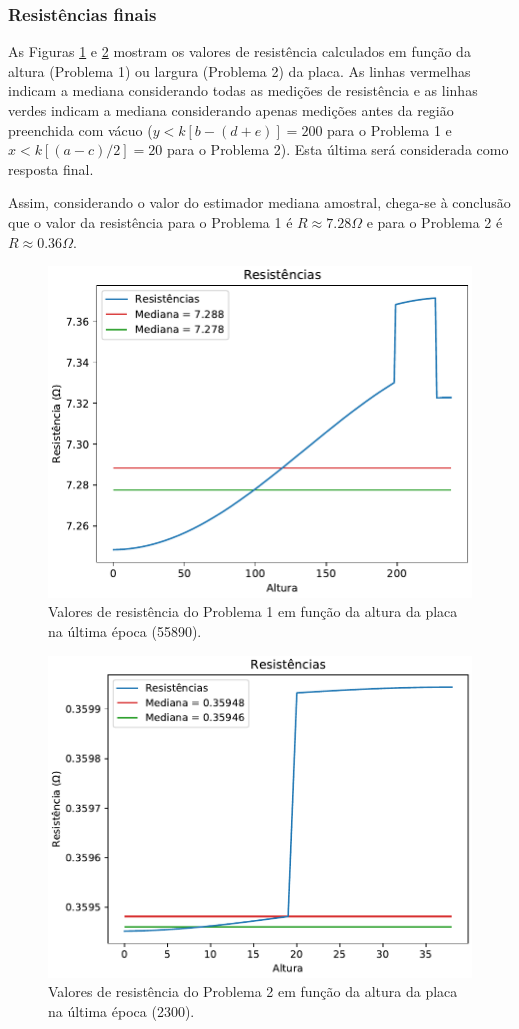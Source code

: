 \documentclass{aleph-revista}
\begin{document}
\newpage
\subsubsection{Resistências finais}

As Figuras \ref{fig:res_p1} e \ref{fig:res_p2} mostram os valores de resistência calculados em função da altura (Problema 1) ou largura (Problema 2) da placa. As linhas vermelhas indicam a mediana considerando todas as medições de resistência e as linhas verdes indicam a mediana considerando apenas medições antes da região preenchida com vácuo ($y < k[b-(d+e)] = 200$ para o Problema 1 e $x < k[(a-c)/2] = 20$ para o Problema 2). Esta última será considerada como resposta final.

Assim, considerando o valor do estimador mediana amostral, chega-se à conclusão que o valor da resistência para o Problema 1 é $R \approx 7.28 \Omega$ e para o Problema 2 é $R \approx 0.36 \Omega$.

\begin{figure}[!ht]
  \centering
  \includegraphics[width=0.7\linewidth]{p1_resistencias}
  \caption{Valores de resistência do Problema 1 em função da altura da placa na última época (55890).}
  \label{fig:res_p1}
\end{figure}

\begin{figure}[!ht]
  \centering
  \includegraphics[width=0.7\linewidth]{p2_resistencias}
  \caption{Valores de resistência do Problema 2 em função da altura da placa na última época (2300).}
  \label{fig:res_p2}
\end{figure}


\end{document}
